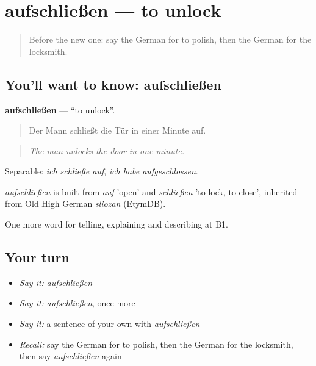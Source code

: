 \section[aufschließen]{aufschließen — to unlock}

\label{lesson:GE-C445-aufschliessen}



\begin{quote}
Before the new one: say the German for to polish, then the German for the locksmith.
\end{quote}

\subsection*{You'll want to know: aufschließen}
\textbf{aufschließen} — \textquotedblleft{}to unlock\textquotedblright{}.

\begin{quote}
Der Mann schließt die Tür in einer Minute auf.
\end{quote}

\begin{quote}
\emph{The man unlocks the door in one minute.}
\end{quote}

Separable: \emph{ich schließe auf}, \emph{ich habe aufgeschlossen}.

\begin{cousinweb}
\emph{aufschließen} is built from \emph{auf} 'open' and \emph{schließen} 'to lock, to close', inherited from Old High German \emph{sliozan} (EtymDB).
\end{cousinweb}

\begin{grammarlens}[title={What you've built}]
One more word for telling, explaining and describing at B1.
\end{grammarlens}

\subsection*{Your turn}
\begin{itemize}
\raggedright
  \item \emph{Say it:} \emph{aufschließen}
  \item \emph{Say it:} \emph{aufschließen}, once more
  \item \emph{Say it:} a sentence of your own with \emph{aufschließen}
  \item \emph{Recall:} say the German for to polish, then the German for the locksmith, then say \emph{aufschließen} again
\end{itemize}

